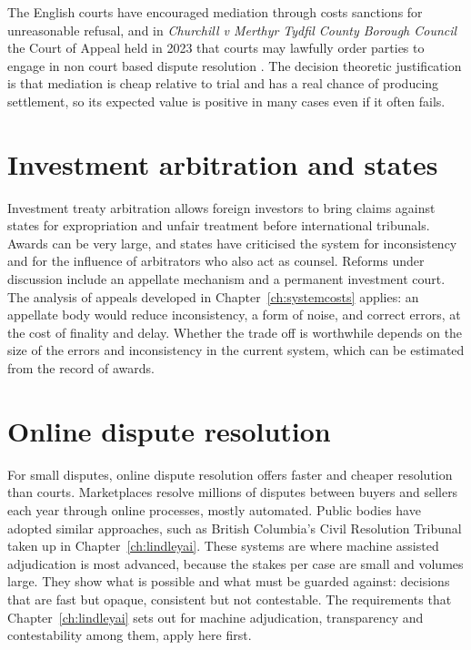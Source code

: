 The English courts have encouraged mediation through costs sanctions for unreasonable refusal, and in \emph{Churchill v Merthyr Tydfil County Borough Council} the Court of Appeal held in 2023 that courts may lawfully order parties to engage in non court based dispute resolution \citep{churchill2023}. The decision theoretic justification is that mediation is cheap relative to trial and has a real chance of producing settlement, so its expected value is positive in many cases even if it often fails.

\section{Investment arbitration and states}

Investment treaty arbitration allows foreign investors to bring claims against states for expropriation and unfair treatment before international tribunals. Awards can be very large, and states have criticised the system for inconsistency and for the influence of arbitrators who also act as counsel. Reforms under discussion include an appellate mechanism and a permanent investment court. The analysis of appeals developed in Chapter~\ref{ch:systemcosts} applies: an appellate body would reduce inconsistency, a form of noise, and correct errors, at the cost of finality and delay. Whether the trade off is worthwhile depends on the size of the errors and inconsistency in the current system, which can be estimated from the record of awards.

\section{Online dispute resolution}

For small disputes, online dispute resolution offers faster and cheaper resolution than courts. Marketplaces resolve millions of disputes between buyers and sellers each year through online processes, mostly automated. Public bodies have adopted similar approaches, such as British Columbia's Civil Resolution Tribunal taken up in Chapter~\ref{ch:lindleyai}. These systems are where machine assisted adjudication is most advanced, because the stakes per case are small and volumes large. They show what is possible and what must be guarded against: decisions that are fast but opaque, consistent but not contestable. The requirements that Chapter~\ref{ch:lindleyai} sets out for machine adjudication, transparency and contestability among them, apply here first.

